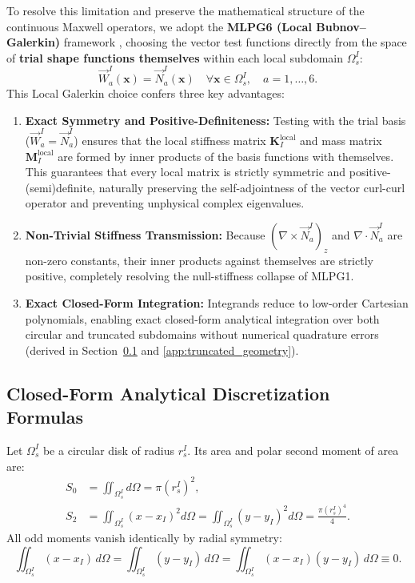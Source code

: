 \documentclass[preprint,12pt]{elsarticle}
\begin{document}
To resolve this limitation and preserve the mathematical structure of the continuous Maxwell operators, we adopt the \textbf{MLPG6 (Local Bubnov--Galerkin)} framework \cite{atluri2002meshless}, choosing the vector test functions directly from the space of \textbf{trial shape functions themselves} within each local subdomain $\Omega_s^I$:
\begin{equation}
    \vec{W}_a^I(\mathbf{x}) = \vec{N}_a^I(\mathbf{x}) \quad \forall \mathbf{x} \in \Omega_s^I, \quad a = 1, \dots, 6.
    \label{eq:mlpg6_choice}
\end{equation}
This Local Galerkin choice confers three key advantages:
\begin{enumerate}
    \item \textbf{Exact Symmetry and Positive-Definiteness:} Testing with the trial basis ($\vec{W}_a^I = \vec{N}_a^I$) ensures that the local stiffness matrix $\mathbf{K}_I^{\mathrm{local}}$ and mass matrix $\mathbf{M}_I^{\mathrm{local}}$ are formed by inner products of the basis functions with themselves. This guarantees that every local matrix is strictly symmetric and positive-(semi)definite, naturally preserving the self-adjointness of the vector curl-curl operator and preventing unphysical complex eigenvalues.
    \item \textbf{Non-Trivial Stiffness Transmission:} Because $(\nabla \times \vec{N}_a^I)_z$ and $\nabla \cdot \vec{N}_a^I$ are non-zero constants, their inner products against themselves are strictly positive, completely resolving the null-stiffness collapse of MLPG1.
    \item \textbf{Exact Closed-Form Integration:} Integrands reduce to low-order Cartesian polynomials, enabling exact closed-form analytical integration over both circular and truncated subdomains without numerical quadrature errors (derived in Section~\ref{subsec:analytic_formulas} and \ref{app:truncated_geometry}).
\end{enumerate}

\subsection{Closed-Form Analytical Discretization Formulas}
\label{subsec:analytic_formulas}

Let $\Omega_s^I$ be a circular disk of radius $r_s^I$. Its area and polar second moment of area are:
\begin{equation}
    \begin{aligned}
        S_0 & = \iint_{\Omega_s^I} d\Omega = \pi (r_s^I)^2,                                                                \\
        S_2 & = \iint_{\Omega_s^I} (x - x_I)^2 d\Omega = \iint_{\Omega_s^I} (y - y_I)^2 d\Omega = \frac{\pi (r_s^I)^4}{4}.
    \end{aligned}
    \label{eq:disk_moments}
\end{equation}
All odd moments vanish identically by radial symmetry:
\begin{equation}
    \iint_{\Omega_s^I} (x - x_I) \, d\Omega = \iint_{\Omega_s^I} (y - y_I) \, d\Omega = \iint_{\Omega_s^I} (x - x_I)(y - y_I) \, d\Omega \equiv 0.
\end{equation}
\end{document}
